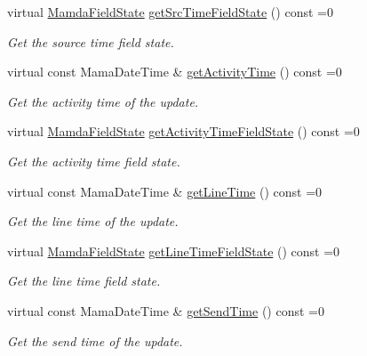 \begin{CompactItemize}
virtual \hyperlink{namespaceWombat_93aac974f2ab713554fd12a1fa3b7d2a}{Mamda\-Field\-State} \hyperlink{classWombat_1_1MamdaBasicRecap_ee5ca73a67ccc8d81b78cf02fa36ec37}{get\-Src\-Time\-Field\-State} () const =0
\begin{CompactList}\small\item\em Get the source time field state. \item\end{CompactList}\item 
virtual const Mama\-Date\-Time \& \hyperlink{classWombat_1_1MamdaBasicRecap_9444ec99a8cfd96a08a7c34a489bd0df}{get\-Activity\-Time} () const =0
\begin{CompactList}\small\item\em Get the activity time of the update. \item\end{CompactList}\item 
virtual \hyperlink{namespaceWombat_93aac974f2ab713554fd12a1fa3b7d2a}{Mamda\-Field\-State} \hyperlink{classWombat_1_1MamdaBasicRecap_04f4a3a041dfc66f733b6c7288b390ac}{get\-Activity\-Time\-Field\-State} () const =0
\begin{CompactList}\small\item\em Get the activity time field state. \item\end{CompactList}\item 
virtual const Mama\-Date\-Time \& \hyperlink{classWombat_1_1MamdaBasicRecap_acebac8f3a0d9a82eef145aca53a6d77}{get\-Line\-Time} () const =0
\begin{CompactList}\small\item\em Get the line time of the update. \item\end{CompactList}\item 
virtual \hyperlink{namespaceWombat_93aac974f2ab713554fd12a1fa3b7d2a}{Mamda\-Field\-State} \hyperlink{classWombat_1_1MamdaBasicRecap_6576c042f1d1db20beb9397873d197c7}{get\-Line\-Time\-Field\-State} () const =0
\begin{CompactList}\small\item\em Get the line time field state. \item\end{CompactList}\item 
virtual const Mama\-Date\-Time \& \hyperlink{classWombat_1_1MamdaBasicRecap_b9425853ac2dfb00d16d68381abae187}{get\-Send\-Time} () const =0
\begin{CompactList}\small\item\em Get the send time of the update. \item\end{CompactList}\item 

\end{CompactItemize}

